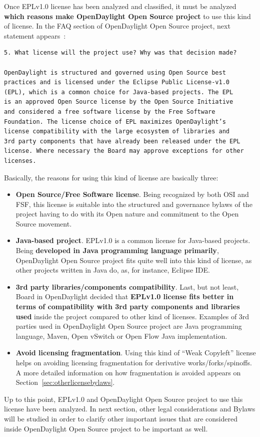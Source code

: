 \documentclass[a4paper, 12pt]{book}
\begin{document}
Once EPLv1.0 license has been analyzed and classified, it must be analyzed \textbf{which reasons make OpenDaylight Open Source project} to use this kind of license. In the FAQ section of OpenDaylight Open Source project, next statement appears~\cite{OpenDaylightFAQ5}:

\begin{verbatim}
5. What license will the project use? Why was that decision made?

OpenDaylight is structured and governed using Open Source best
practices and is licensed under the Eclipse Public License-v1.0
(EPL), which is a common choice for Java-based projects. The EPL
is an approved Open Source license by the Open Source Initiative
and considered a free software license by the Free Software
Foundation. The license choice of EPL maximizes OpenDaylight’s
license compatibility with the large ecosystem of libraries and
3rd party components that have already been released under the EPL
license. Where necessary the Board may approve exceptions for other
licenses.
\end{verbatim}
Basically, the reasons for using this kind of license are basically three:
\begin{itemize}
 \item{\textbf{Open Source/Free Software license}}. Being recognized by both OSI and FSF, this license is suitable into the structured and governance bylaws of the project having to do with its Open nature and commitment to the Open Source movement.
 \item{\textbf{Java-based project}}. EPLv1.0 is a common license for Java-based projects. Being \textbf{developed in Java programming language primarily}, OpenDaylight Open Source project fits quite well into this kind of license, as other projects written in Java do, as, for instance, Eclipse IDE.
 \item{\textbf{3rd party libraries/components compatibility}}. Last, but not least, Board in OpenDaylight decided that \textbf{EPLv1.0 license fits better in terms of compatibility with 3rd party components and libraries used} inside the project compared to other kind of licenses. Examples of 3rd parties used in OpenDaylight Open Source project are Java programming language, Maven, Open vSwitch or Open Flow Java implementation.
 \item{\textbf{Avoid licensing fragmentation}}. Using this kind of ``Weak Copyleft'' license helps on avoiding licensing fragmentation for derivative works/forks/spinoffs. A more detailed information on how fragmentation is avoided appears on Section~\ref{sec:otherlicensebylaws}.
\end{itemize}
Up to this point, EPLv1.0 and OpenDaylight Open Source project to use this license have been analyzed. In next section, other legal considerations and Bylaws will be studied in order to clarify other important issues that are considered inside OpenDaylight Open Source project to be important as well.
\end{document}
